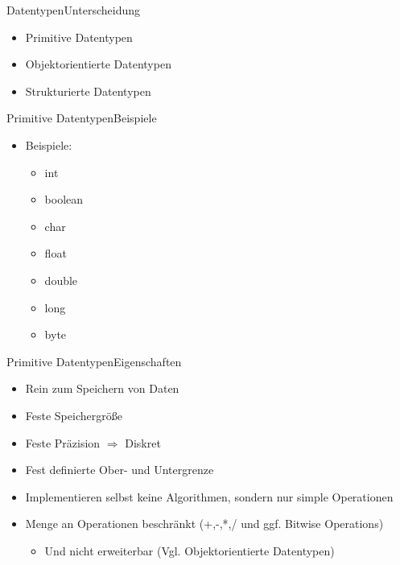 \begin{frame}{Datentypen}{Unterscheidung}
    \begin{itemize}
        \item Primitive Datentypen
        \item Objektorientierte Datentypen
        \item Strukturierte Datentypen
    \end{itemize}
\end{frame}

\begin{frame}{Primitive Datentypen}{Beispiele}
    \begin{itemize}
    \item Beispiele:
        \begin{itemize}
            \item int
            \item boolean
            \item char
            \item float
            \item double
            \item long
            \item byte
        \end{itemize}
    \end{itemize}
\end{frame}

\begin{frame}{Primitive Datentypen}{Eigenschaften}
    \begin{itemize}
        \item Rein zum Speichern von Daten
        \item Feste Speichergröße
        \item Feste Präzision $\Rightarrow$ Diskret
        \item Fest definierte Ober- und Untergrenze
        \item Implementieren selbst keine Algorithmen, sondern nur simple Operationen
        \item Menge an Operationen beschränkt (+,-,*,/ und ggf. Bitwise Operations)
        \begin{itemize}
            \item Und nicht erweiterbar (Vgl. Objektorientierte Datentypen)
        \end{itemize}
    \end{itemize}
\end{frame}

